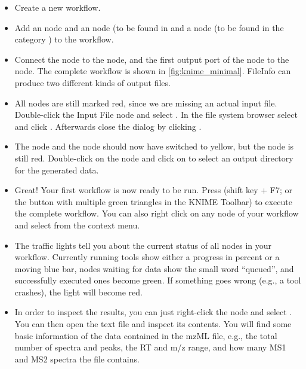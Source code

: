 \begin{itemize}
\item
Create a new workflow.
\item Add an  node and an  node (to be found in  and a  node (to be found in the category ) to the workflow.
\item Connect the  node to the  node, and the first output port of the  node to the  node.
The complete workflow is shown in \cref{fig:knime_minimal}.
FileInfo can produce two different kinds of output files.
\item All nodes are still marked red, since we are missing an actual input file.
Double-click the Input File node and select .
In the file system browser select  and click .
Afterwards close the dialog by clicking .
\item The  node and the  node should now have switched to yellow, but the  node is still red.
Double-click on the  node and click on  to select an output directory for the generated data.
\item Great! Your first workflow is now ready to be run. Press  (shift key + F7; or the button with multiple green triangles in the KNIME Toolbar) to execute the complete workflow.
You can also right click on any node of your workflow and select  from the context menu.
\item The traffic lights tell you about the current status of all nodes in your workflow.
Currently running tools show either a progress in percent or a moving blue bar, nodes waiting for data show the small word ``queued'', and successfully executed ones become green.
If something goes wrong (e.g., a tool crashes), the light will become red.
\item In order to inspect the results, you can just right-click the  node and select .
You can then open the text file and inspect its contents.
You will find some basic information of the data contained in the mzML file, e.g., the total number of spectra and peaks, the RT and m/z range, and how many MS1 and MS2 spectra the file contains.
\end{itemize}

